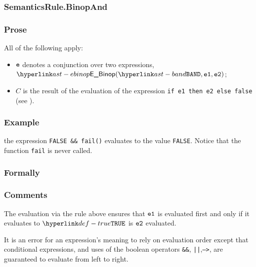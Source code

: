 \subsubsection{SemanticsRule.BinopAnd \label{sec:SemanticsRule.BinopAnd}}
\subsubsection{Prose}
All of the following apply:
\begin{itemize}
\item $\ve$ denotes a conjunction over two expressions,
      $\EBinop(\BAND, \veone, \vetwo)$;
\item $C$ is the result of the evaluation of the expression
      \texttt{if e1 then e2 else false} (see ).
\end{itemize}

\subsubsection{Example}
the expression \texttt{FALSE \&\& fail()} evaluates to the value \texttt{FALSE}. Notice that the function \texttt{fail} is never called.


\subsubsection{Formally}
\begin{mathpar}
\end{mathpar}

\subsubsection{Comments}
The evaluation via the rule above ensures that $\veone$ is evaluated first and
only if it evaluates to $\True$ is $\vetwo$ evaluated.



It is an error for an expression’s meaning to rely on evaluation order except
that conditional expressions, and uses of the boolean operators \texttt{\&\&},
\texttt{||},\texttt{-->}, are guaranteed to evaluate from left to right.

